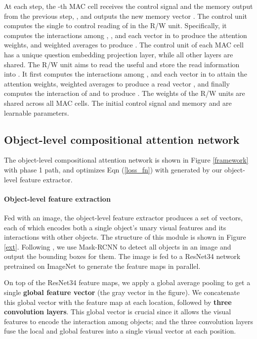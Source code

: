 \documentclass[final]{cvpr}
\begin{document}
At each step, the -th MAC cell receives the control signal  and the memory output from the previous step, , and outputs the new memory vector .
The control unit computes the single  to control reading of  in the R/W unit. Specifically, it computes the interactions among , , and each vector in  to produce the attention weights, and weighted averages  to produce . The control unit of each MAC cell has a unique question embedding projection layer, while all other layers are shared.
The R/W unit aims to read the useful  and store the read information into . It first computes the interactions among ,  and each vector in  to attain the attention weights, weighted averages  to produce a read vector , and finally computes the interaction of  and  to produce .  The weights of the R/W units are shared across all MAC cells. 
The initial control signal and memory  and  are learnable parameters. 






\subsection{Object-level compositional attention network}
\label{ssec:object_mac}
The object-level compositional attention network is shown in Figure \ref{framework} with phase 1 path, and optimizes Eqn (\ref{loss_fn}) with  generated by our object-level feature extractor. 
\vspace{-4mm}

\paragraph{Object-level feature extraction}
Fed with an image, the object-level feature extractor produces a set of vectors, each of which encodes both a single object's unary visual features and its interactions with other objects. The structure of this module is shown in Figure \ref{ext}. Following \cite{mao2018neuro}, we use Mask-RCNN \cite{he2017mask} to detect all objects in an image and output the bounding boxes for them. 
The image is fed to a ResNet34 network \cite{He_2016_CVPR} pretrained on ImageNet \cite{deng2009imagenet} to generate the feature maps in parallel.

On top of the ResNet34 feature maps, we apply a global average pooling to get a single \textbf{global feature vector} (the gray vector in the figure). We concatenate this global vector with the feature map at each location, followed by \textbf{three convolution layers}.
This global vector is crucial since it allows the visual features to encode the interaction among objects; and the three convolution layers {fuse} the local and global features into a single visual vector at each position.
\end{document}
